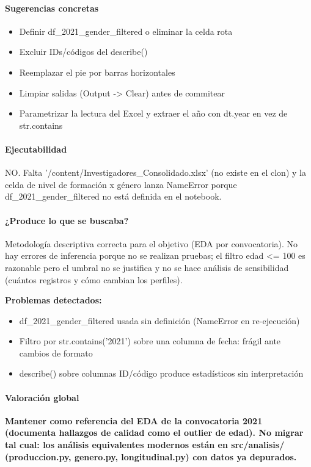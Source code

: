 \paragraph{Sugerencias concretas}
\begin{itemize}
  \item Definir df\_2021\_gender\_filtered o eliminar la celda rota
  \item Excluir IDs/códigos del describe()
  \item Reemplazar el pie por barras horizontales
  \item Limpiar salidas (Output -> Clear) antes de commitear
  \item Parametrizar la lectura del Excel y extraer el año con dt.year en vez de str.contains
\end{itemize}

\paragraph{Ejecutabilidad}
NO. Falta '/content/Investigadores\_Consolidado.xlsx' (no existe en el clon) y la celda de nivel de formación x género lanza NameError porque df\_2021\_gender\_filtered no está definida en el notebook.

\paragraph{¿Produce lo que se buscaba?}
Metodología descriptiva correcta para el objetivo (EDA por convocatoria). No hay errores de inferencia porque no se realizan pruebas; el filtro edad <= 100 es razonable pero el umbral no se justifica y no se hace análisis de sensibilidad (cuántos registros y cómo cambian los perfiles).

\begin{tcolorbox}[riesgo]
\textbf{Problemas detectados:}
\begin{itemize}
  \item df\_2021\_gender\_filtered usada sin definición (NameError en re-ejecución)
  \item Filtro por str.contains('2021') sobre una columna de fecha: frágil ante cambios de formato
  \item describe() sobre columnas ID/código produce estadísticos sin interpretación
\end{itemize}
\end{tcolorbox}

\paragraph{Valoración global}
\textbf{Mantener como referencia del EDA de la convocatoria 2021 (documenta hallazgos de calidad como el outlier de edad). No migrar tal cual: los análisis equivalentes modernos están en src/analisis/ (produccion.py, genero.py, longitudinal.py) con datos ya depurados.}

